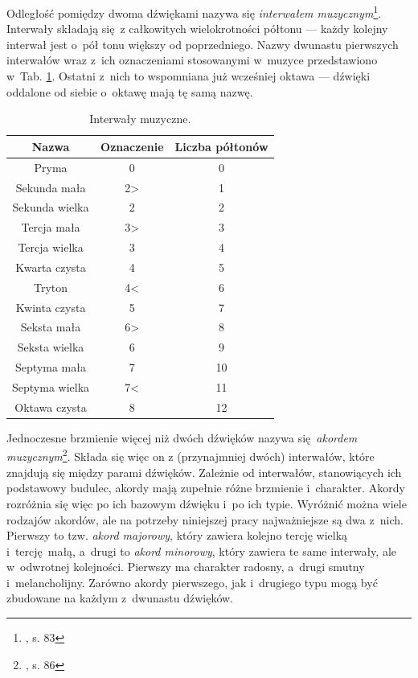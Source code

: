 Odległość pomiędzy dwoma dźwiękami nazywa się \emph{interwałem muzycznym}\footnote{\cite{lerch_introduction_2012}, s.  83}. Interwały składają się z całkowitych wielokrotności półtonu --- każdy kolejny interwał jest o~pół tonu większy od poprzedniego. Nazwy dwunastu pierwszych interwałów wraz z~ich oznaczeniami stosowanymi w~muzyce przedstawiono w~Tab. \ref{tab:interwaly}. Ostatni z~nich to wspomniana już wcześniej oktawa --- dźwięki oddalone od siebie o~oktawę mają tę samą nazwę. 

\begin{table}[htb]
    \centering
    \caption{Interwały muzyczne.}
    \label{tab:interwaly}
    \begin{tabular}{|c|c|c|} \hline
        Nazwa & Oznaczenie & Liczba półtonów \\ \hline
        Pryma           & 0     & 0  \\
        Sekunda mała    & 2>    & 1  \\
        Sekunda wielka  & 2     & 2  \\
        Tercja mała     & 3>    & 3  \\
        Tercja wielka   & 3     & 4  \\
        Kwarta czysta   & 4     & 5  \\
        Tryton          & 4<    & 6  \\
        Kwinta czysta   & 5     & 7  \\
        Seksta mała     & 6>    & 8  \\
        Seksta wielka   & 6     & 9  \\
        Septyma mała    & 7     & 10 \\
        Septyma wielka  & 7<    & 11 \\
        Oktawa czysta   & 8     & 12 \\ \hline
    \end{tabular}
\end{table}

Jednoczesne brzmienie więcej niż dwóch dźwięków nazywa się \emph{akordem muzycznym}\footnote{\cite{lerch_introduction_2012}, s. 86}. Składa się więc on z (przynajmniej dwóch) interwałów, które znajdują się między parami dźwięków. Zależnie od interwałów, stanowiących ich podstawowy budulec, akordy mają zupełnie różne brzmienie i~charakter. Akordy rozróżnia się więc po ich bazowym dźwięku i~po ich typie. Wyróżnić można wiele rodzajów akordów, ale na potrzeby niniejszej pracy najważniejsze są dwa z~nich.  Pierwszy to tzw. \emph{akord majorowy}, który zawiera kolejno tercję wielką i~tercję małą, a~drugi to \emph{akord minorowy}, który zawiera te same interwały, ale w~odwrotnej kolejności. Pierwszy ma charakter radosny, a~drugi smutny i~melancholijny. Zarówno akordy pierwszego, jak i~drugiego typu mogą być zbudowane na każdym z~dwunastu dźwięków. 

